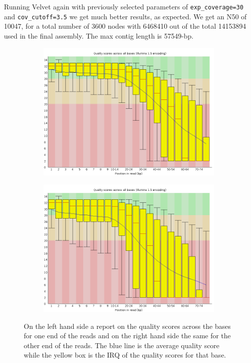 \documentclass[a4paper,12pt]{article}
\begin{document}
Running Velvet again with previously selected parameters of
\verb+exp_coverage=30+ and \verb+cov_cutoff=3.5+ we get much better
results, as expected. We get an N50 of 10047, for a total number of
3600 nodes with 6468410 out of the total 14153894 used in the final
assembly. The max contig length is 57549-bp.
\begin{figure}
\centering
\begin{subfigure}{.5\textwidth}
  \centering
  \includegraphics[width=1.\linewidth]{images/per_base_quality_r1}
  \caption{}
  \label{fig:r1_qc}
\end{subfigure}%
\begin{subfigure}{.5\textwidth}
  \centering
  \includegraphics[width=1.\linewidth]{images/per_base_quality_r2.png}
  \caption{}
  \label{fig:r2_qc}
\end{subfigure}
\caption{
  On the left hand side a report on the quality scores across the
  bases for one end of the reads and on the right hand side the same
  for the other end of the reads. The blue line is the average quality
  score while the yellow box is the IRQ of the quality scores for that
  base.
}
\label{fig:qc}
\end{figure}
\end{document}
